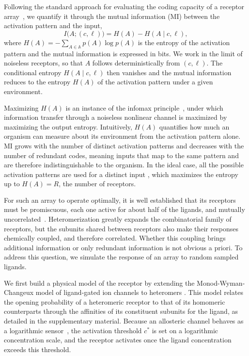 \documentclass[aps,pre,twocolumn,superscriptaddress,floatfix,longbibliography]{revtex4-2}
\begin{document}
Following the standard approach for evaluating the coding capacity of a
receptor array~\cite{fonollosa_quality_2012, del_castillo_convergent_2026}, we
quantify it through the mutual information (MI) between the activation pattern
and the input,
\begin{equation}
    I\bigl(A;(c,\ell)\bigr) = H(A) - H(A \mid c,\ell),
\end{equation}
where $H(A) = -\sum_{A\in\mathbb{A}} p(A)\log p(A)$ is the entropy of the activation pattern
and the mutual information is expressed in bits. We work in the limit of
noiseless receptors, so that $A$ follows deterministically from $(c,\ell)$.
The conditional entropy $H(A \mid c,\ell)$ then vanishes and the mutual
information reduces to the entropy $H(A)$ of the activation pattern under a
given environment.

{\color{blue}
Maximizing $H(A)$ is an instance of the infomax
principle~\cite{bell_information-maximization_1995}, under which information
transfer through a noiseless nonlinear channel is maximized by maximizing the
output entropy. Intuitively, $H(A)$ quantifies how much an organism can measure
about its environment from the activation pattern alone. MI grows with the
number of distinct activation patterns and decreases with the number of
redundant codes, meaning inputs that map to the same pattern and are therefore
indistinguishable to the organism. In the ideal case, all the possible activation patterns are used for a distinct input , which maximizes the entropy up to $H(A) = R$, the number of
receptors.
}

For such an array to operate optimally, it is well established that its
receptors must be promiscuous, each one active for about half of the
ligands, and mutually uncorrelated~\cite{zwicker_receptor_2016,
fonollosa_quality_2012}. Heteromerization greatly expands the combinatorial
family of receptors, but the subunits shared between receptors also make their
responses chemically coupled, and therefore correlated. Whether this coupling
brings additional information or only redundant information is not obvious a
priori. To address this question, we simulate the response of an array to
random sampled ligands.

We first build a physical model of the receptor by extending the
Monod-Wyman-Changeux model of ligand-gated ion channels to heteromers \cite{einav_monod-wyman-changeux_2017}. This
model relates the opening probability of a heteromeric receptor to that of its
homomeric counterparts through the affinities of its constituent subunits for
the ligand, as detailed in the
supplementary material. Because an allosteric channel behaves as a logarithmic
sensor~\cite{olsman_allosteric_2016}, the activation threshold $c^*$ is set on
a logarithmic concentration scale, and the receptor activates once the ligand
concentration exceeds this threshold.
\end{document}
